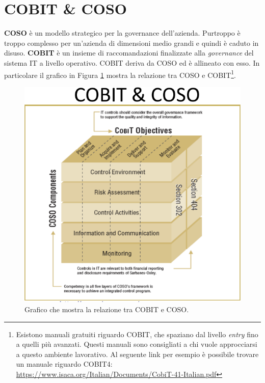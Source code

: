 \section{COBIT \& COSO}

\textbf{COSO} è un modello strategico per la governance dell'azienda. Purtroppo 
è troppo complesso per un'azienda di dimensioni medio grandi e quindi è caduto 
in disuso.
\textbf{COBIT} è un insieme di raccomandazioni finalizzate alla \textit{governance} 
del sistema IT a livello operativo.
COBIT deriva da COSO ed è allineato con esso. In particolare il grafico in Figura
\ref{fig:cobit:coso:relazione} mostra la relazione tra COSO e COBIT\footnote{Esistono manuali gratuiti 
riguardo COBIT, che spaziano dal livello \textit{entry} fino a quelli più 
avanzati. Questi manuali sono consigliati a chi vuole approcciarsi a questo ambiente 
lavorativo. Al seguente link per esempio è possibile trovare un manuale riguardo 
COBIT4:  \url{https://www.isaca.org/Italian/Documents/CobiT-41-Italian.pdf}}.
\begin{figure}[h!]
        \begin{center}
                \includegraphics[scale=2.0]{res/img/cobit_coso_cube}
        \end{center}
        \caption{Grafico che mostra la relazione tra COBIT e COSO.}
        \label{fig:cobit:coso:relazione}
\end{figure}

